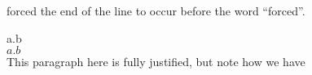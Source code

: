 \documentclass[12pt,a4paper]{article}
\begin{document}
\begin{flushleft}
forced the end of the line to occur before the word “forced”.
\end{flushleft}
a.b\\
$ a.b $\\
This paragraph here is fully justified, but note how we have \linebreak
\end{document}
